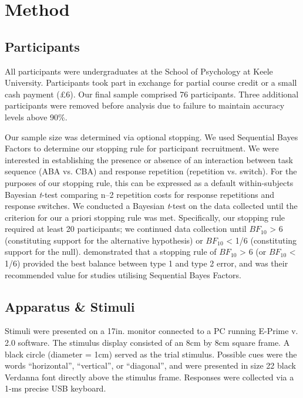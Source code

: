 \documentclass[a4paper, man, natbib]{apa6}
\begin{document}
\section{Method}

\subsection{Participants}
All participants were undergraduates at the School of Psychology at Keele University. Participants took part in exchange for partial course credit or a small cash payment (£6). Our final sample comprised 76 participants. Three additional participants were removed before analysis due to failure to maintain accuracy levels above 90\%.

Our sample size was determined via optional stopping. We used Sequential Bayes Factors \citep{Schoenbrodtinpress} to determine our stopping rule for participant recruitment. We were interested in establishing the presence or absence of an interaction between task sequence (ABA vs. CBA) and response repetition (repetition vs. switch). For the purposes of our stopping rule, this can be expressed as a default within-subjects Bayesian \emph{t}-test \citep{Rouder2009} comparing n--2 repetition costs for response repetitions and response switches.  We conducted a Bayesian \emph{t}-test on the data collected until the criterion for our a priori stopping rule was met. Specifically, our stopping rule required at least 20 participants; we continued data collection until $BF_{10}$ > 6 (constituting support for the alternative hypothesis) or $BF_{10}$ < 1/6 (constituting support for the null). \cite{Schoenbrodtinpress} demonstrated that a stopping rule of $BF_{10}$ > 6 (or $BF_{10}$ < 1/6) provided the best balance between type 1 and type 2 error, and was their recommended value for studies utilising Sequential Bayes Factors. 

\subsection{Apparatus \& Stimuli}
Stimuli were presented on a 17in. monitor connected to a PC running E-Prime v. 2.0 software. The stimulus display consisted of an 8cm by 8cm square frame. A black circle (diameter = 1cm) served as the trial stimulus. Possible cues were the words ``horizontal'', ``vertical'', or ``diagonal'', and were presented in size 22 black Verdanna font directly above the stimulus frame. Responses were collected via a 1-ms precise USB keyboard.
\end{document}
